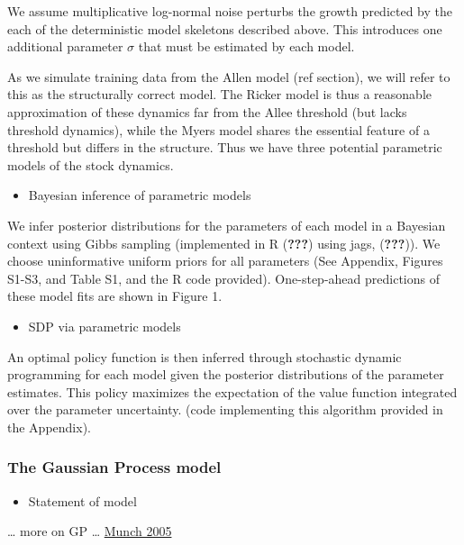 \documentclass[author-year, review]{elsarticle} %
\begin{document}
We assume multiplicative log-normal noise perturbs the growth predicted
by the each of the deterministic model skeletons described above. This
introduces one additional parameter $\sigma$ that must be estimated by
each model.

As we simulate training data from the Allen model (ref section), we will
refer to this as the structurally correct model. The Ricker model is
thus a reasonable approximation of these dynamics far from the Allee
threshold (but lacks threshold dynamics), while the Myers model shares
the essential feature of a threshold but differs in the structure. Thus
we have three potential parametric models of the stock dynamics.

\begin{itemize}
\itemsep1pt\parskip0pt
\item
  Bayesian inference of parametric models
\end{itemize}

We infer posterior distributions for the parameters of each model in a
Bayesian context using Gibbs sampling (implemented in R ({\textbf{???}})
using jags, ({\textbf{???}})). We choose uninformative uniform priors
for all parameters (See Appendix, Figures S1-S3, and Table S1, and the R
code provided). One-step-ahead predictions of these model fits are shown
in Figure 1.

\begin{itemize}
\itemsep1pt\parskip0pt
\item
  SDP via parametric models
\end{itemize}

An optimal policy function is then inferred through stochastic dynamic
programming for each model given the posterior distributions of the
parameter estimates. This policy maximizes the expectation of the value
function integrated over the parameter uncertainty. (code implementing
this algorithm provided in the Appendix).

\subsubsection{The Gaussian Process
model}\label{the-gaussian-process-model}

\begin{itemize}
\itemsep1pt\parskip0pt
\item
  Statement of model
\end{itemize}

\ldots{} more on GP \ldots{} \href{}{Munch 2005}
\end{document}
